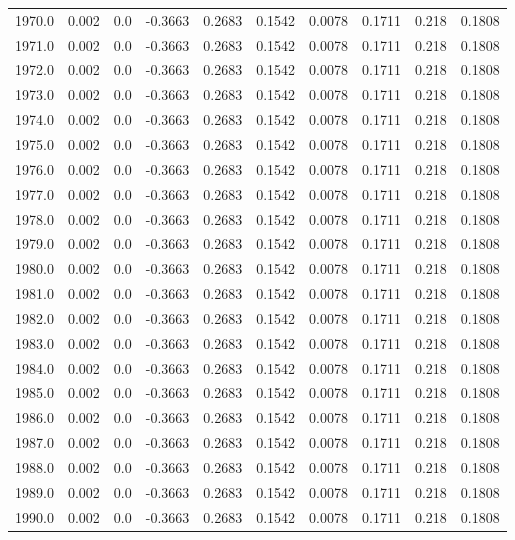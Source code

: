 \begin{longtable}{lrrrrrrrrr}
1970.0 & 0.002 & 0.0 & -0.3663 & 0.2683 & 0.1542 & 0.0078 & 0.1711 & 0.218 & 0.1808 \\
1971.0 & 0.002 & 0.0 & -0.3663 & 0.2683 & 0.1542 & 0.0078 & 0.1711 & 0.218 & 0.1808 \\
1972.0 & 0.002 & 0.0 & -0.3663 & 0.2683 & 0.1542 & 0.0078 & 0.1711 & 0.218 & 0.1808 \\
1973.0 & 0.002 & 0.0 & -0.3663 & 0.2683 & 0.1542 & 0.0078 & 0.1711 & 0.218 & 0.1808 \\
1974.0 & 0.002 & 0.0 & -0.3663 & 0.2683 & 0.1542 & 0.0078 & 0.1711 & 0.218 & 0.1808 \\
1975.0 & 0.002 & 0.0 & -0.3663 & 0.2683 & 0.1542 & 0.0078 & 0.1711 & 0.218 & 0.1808 \\
1976.0 & 0.002 & 0.0 & -0.3663 & 0.2683 & 0.1542 & 0.0078 & 0.1711 & 0.218 & 0.1808 \\
1977.0 & 0.002 & 0.0 & -0.3663 & 0.2683 & 0.1542 & 0.0078 & 0.1711 & 0.218 & 0.1808 \\
1978.0 & 0.002 & 0.0 & -0.3663 & 0.2683 & 0.1542 & 0.0078 & 0.1711 & 0.218 & 0.1808 \\
1979.0 & 0.002 & 0.0 & -0.3663 & 0.2683 & 0.1542 & 0.0078 & 0.1711 & 0.218 & 0.1808 \\
1980.0 & 0.002 & 0.0 & -0.3663 & 0.2683 & 0.1542 & 0.0078 & 0.1711 & 0.218 & 0.1808 \\
1981.0 & 0.002 & 0.0 & -0.3663 & 0.2683 & 0.1542 & 0.0078 & 0.1711 & 0.218 & 0.1808 \\
1982.0 & 0.002 & 0.0 & -0.3663 & 0.2683 & 0.1542 & 0.0078 & 0.1711 & 0.218 & 0.1808 \\
1983.0 & 0.002 & 0.0 & -0.3663 & 0.2683 & 0.1542 & 0.0078 & 0.1711 & 0.218 & 0.1808 \\
1984.0 & 0.002 & 0.0 & -0.3663 & 0.2683 & 0.1542 & 0.0078 & 0.1711 & 0.218 & 0.1808 \\
1985.0 & 0.002 & 0.0 & -0.3663 & 0.2683 & 0.1542 & 0.0078 & 0.1711 & 0.218 & 0.1808 \\
1986.0 & 0.002 & 0.0 & -0.3663 & 0.2683 & 0.1542 & 0.0078 & 0.1711 & 0.218 & 0.1808 \\
1987.0 & 0.002 & 0.0 & -0.3663 & 0.2683 & 0.1542 & 0.0078 & 0.1711 & 0.218 & 0.1808 \\
1988.0 & 0.002 & 0.0 & -0.3663 & 0.2683 & 0.1542 & 0.0078 & 0.1711 & 0.218 & 0.1808 \\
1989.0 & 0.002 & 0.0 & -0.3663 & 0.2683 & 0.1542 & 0.0078 & 0.1711 & 0.218 & 0.1808 \\
1990.0 & 0.002 & 0.0 & -0.3663 & 0.2683 & 0.1542 & 0.0078 & 0.1711 & 0.218 & 0.1808 \\

\end{longtable}
